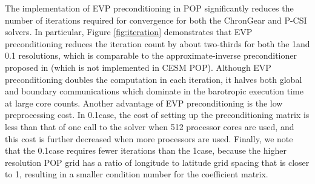 The implementation of EVP preconditioning in POP significantly reduces
the number of iterations required for convergence for both the ChronGear and P-CSI solvers.
In particular,  Figure \ref{fig:iteration} demonstrates that EVP
preconditioning reduces the iteration count by about two-thirds for
both the 1\degree\space and 0.1 \degree\space resolutions, which is comparable to the
approximate-inverse preconditioner proposed in
\cite{smith1992parallel} (which is not implemented in CESM POP).
Although  EVP preconditioning doubles the computation in each iteration, it halves both global and boundary communications
which dominate in the barotropic execution time at large core counts.
Another advantage of EVP preconditioning is the low
preprocessing cost.
In 0.1\degree\space case, the cost of setting up the preconditioning matrix
is less than that of one call to the solver when 512 processor cores
are used, and this cost is further decreased when more processors are used.
Finally, we note that the 0.1\degree\space case requires fewer iterations than the
1\degree\space case, because the higher resolution POP grid has a 
ratio of longitude to latitude grid spacing that is closer to 1, resulting
in a smaller condition number for the coefficient matrix.
